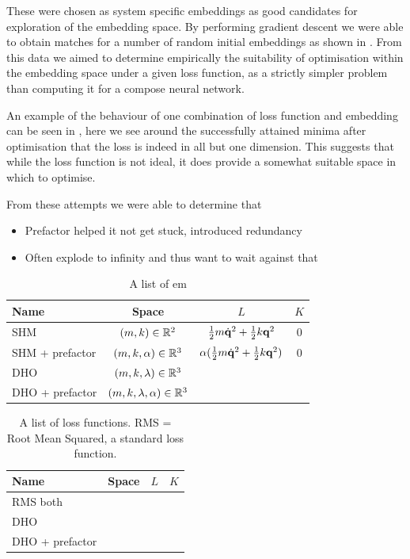 These were chosen as system specific embeddings as good candidates for exploration of the embedding space. By performing gradient descent we were able to obtain matches for a number of random initial embeddings  as shown in . From this data we aimed to determine empirically the suitability of optimisation within the embedding space under a given loss function, as a strictly simpler problem than computing it for a compose neural network.

An example of the behaviour of one combination of loss function and embedding can be seen in , here we see around the successfully attained minima after optimisation that the loss is indeed in all but one  dimension. This suggests that while the loss function is not ideal, it does provide a somewhat suitable space in which to optimise.

From these attempts we were able to determine that

\begin{itemize}
  \item Prefactor helped it not get stuck, introduced redundancy
  \item Often explode to infinity and thus want to wait against that
\end{itemize}


\begin{table}
\label{table:embedding-choices}
\caption{A list of em}
\begin{tabular}{l|c|c|c}
  Name & Space & $L$ & $K$ \\
  \hline
  SHM & $(m, k) \in \mathbb{R}^2$ & $\frac 12 m \dot {\vb{q}}^2 + \frac 12 k \vb{q}^2$ & 0 \\
  SHM + prefactor & $(m, k, \alpha) \in \mathbb{R}^3$ & $\alpha(\frac 12 m \dot {\vb{q}}^2 + \frac 12 k \vb{q}^2)$ & 0 \\
  DHO & $(m, k, \lambda) \in \mathbb{R}^3$ & \\
  DHO + prefactor & $(m, k, \lambda, \alpha) \in \mathbb{R}^3$
\end{tabular}
\end{table}

\begin{table}
\label{table:loss-fns}
\caption{A list of loss functions. RMS = Root Mean Squared, a standard loss function.}
\begin{tabular}{l|c|c|c}
  Name & Space & $L$ & $K$ \\
  \hline
  RMS both \\
  DHO \\
  DHO + prefactor \\
\end{tabular}
\end{table}

